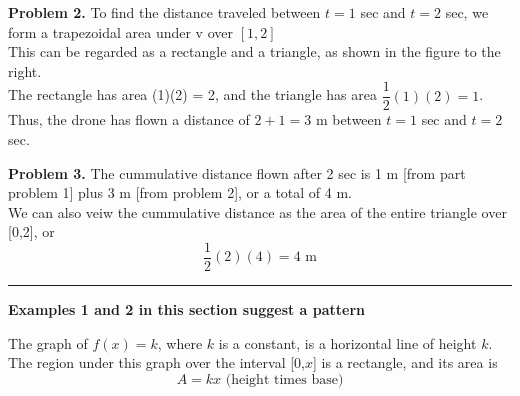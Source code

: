 \documentclass{report}
\begin{document}
\pagebreak
\noindent
\begin{minipage}{0.5\textwidth}
  \noindent\textbf{Problem 2.} To find the distance traveled between $t=1$ sec and $t=2$ sec, we form a trapezoidal area under v over $[1,2]$ \\ This can be regarded as a rectangle and a triangle, as shown in the figure to the right. \\ The rectangle has area (1)(2) = 2, and the triangle has area $\dfrac{1}{2}(1)(2) = 1$.\\
  Thus, the drone has flown a distance of $ 2 + 1  = 3 \text{ m}$ between $t=1$ sec and $ t=2$ sec.
\end{minipage}
\hspace{10mm}\begin{minipage}{0.5\textwidth}
\end{minipage}
\begin{figure}[ht]
    \centering
\end{figure}
\bigbreak \noindent
\begin{minipage}{0.5\textwidth}
  \textbf{Problem 3.}	The cummulative distance flown after 2 sec is 1 m [from part problem 1] plus 3 m [from problem 2], or a total of 4 m. \\ We can also veiw the cummulative distance as the area of the entire triangle over [0,2], or
  $$ \dfrac{1}{2}(2)(4) = 4 \text{ m}$$
\end{minipage}
\hspace{10mm}\begin{minipage}{0.5\textwidth}
\end{minipage}
\begin{figure}[ht]
    \centering
\end{figure}
\bigbreak \noindent
\hrule
\bigbreak \noindent
\textbf{Examples 1 and 2 in this section suggest a pattern}
\bigbreak \noindent \bigbreak \noindent
\begin{minipage}{0.5\textwidth}
The graph of $f(x) = k$, where $k$ is a constant, is a horizontal line of height $k$. The region under this graph over the interval [0,$x$] is a rectangle, and its area is
    $$ A = kx \text{ (height times base)}$$
\end{minipage}
\hspace{10mm}\begin{minipage}{0.5\textwidth}
\end{minipage}
\end{document}
